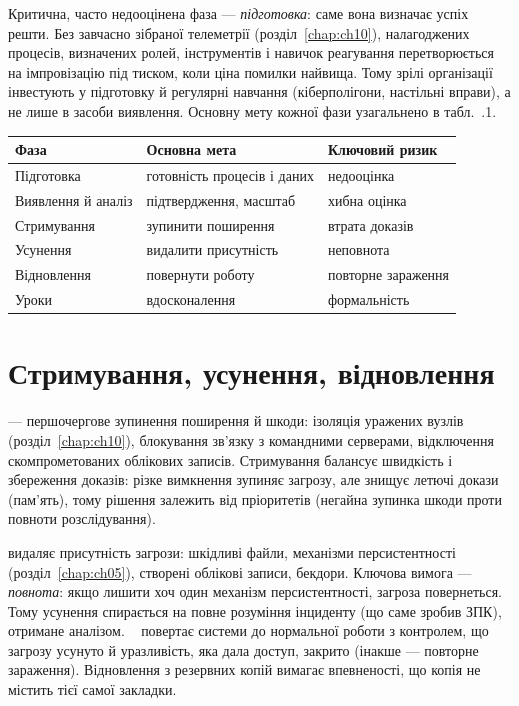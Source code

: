 Критична, часто недооцінена фаза --- \emph{підготовка}: саме вона визначає успіх решти. Без завчасно зібраної телеметрії (розділ~\ref{chap:ch10}), налагоджених процесів, визначених ролей, інструментів і навичок реагування перетворюється на імпровізацію під тиском, коли ціна помилки найвища. Тому зрілі організації інвестують у підготовку й регулярні навчання (кіберполігони, настільні вправи), а не лише в засоби виявлення. Основну мету кожної фази узагальнено в табл.~\thechapter.1.


\begin{center}\footnotesize
\begin{tabularx}{\linewidth}{L{22mm} Y L{20mm}}
\toprule
Фаза & Основна мета & Ключовий ризик \\
\midrule
Підготовка & готовність процесів і даних & недооцінка \\
Виявлення й аналіз & підтвердження, масштаб & хибна оцінка \\
Стримування & зупинити поширення & втрата доказів \\
Усунення & видалити присутність & неповнота \\
Відновлення & повернути роботу & повторне зараження \\
Уроки & вдосконалення & формальність \\
\bottomrule
\end{tabularx}
\end{center}

\section{Стримування, усунення, відновлення}\label{sec:ch16-containment}

 --- першочергове зупинення поширення й шкоди: ізоляція уражених вузлів (розділ~\ref{chap:ch10}), блокування зв'язку з командними серверами, відключення скомпрометованих облікових записів. Стримування балансує швидкість і збереження доказів: різке вимкнення зупиняє загрозу, але знищує летючі докази (пам'ять), тому рішення залежить від пріоритетів (негайна зупинка шкоди проти повноти розслідування).

 видаляє присутність загрози: шкідливі файли, механізми персистентності (розділ~\ref{chap:ch05}), створені облікові записи, бекдори. Ключова вимога --- \emph{повнота}: якщо лишити хоч один механізм персистентності, загроза повернеться. Тому усунення спирається на повне розуміння інциденту (що саме зробив ЗПК), отримане аналізом. ~\cite{ch16:recovery} повертає системи до нормальної роботи з контролем, що загрозу усунуто й уразливість, яка дала доступ, закрито (інакше --- повторне зараження). Відновлення з резервних копій вимагає впевненості, що копія не містить тієї самої закладки.

